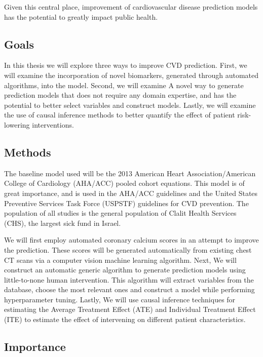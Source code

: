 \documentclass[a4paper,12pt]{article}
\begin{document}
		Given this central place, improvement of cardiovascular disease prediction models has the potential to greatly impact public health.
		
		\subsection{Goals}
		
		In this thesis we will explore three ways to improve CVD prediction. First, we will examine the incorporation of novel biomarkers, generated through automated algorithms, into the model. Second, we will examine A novel way to generate prediction models that does not require any domain expertise, and has the potential to better select variables and construct models. Lastly, we will examine the use of causal inference methods to better quantify the effect of patient risk-lowering interventions.

		\subsection{Methods}
		
		The baseline model used will be the 2013 American Heart Association/American College of Cardiology (AHA/ACC) pooled cohort equations\cite{Goff2014}. This model is of great importance, and is used in the AHA/ACC guidelines and the United States Preventive Services Task Force (USPSTF) guidelines for CVD prevention\cite{Bibbins-Domingo2016}. The population of all studies is the general population of Clalit Health Services (CHS), the largest sick fund in Israel.
		
		We will first employ automated coronary calcium scores in an attempt to improve the prediction. These scores will be generated automatically from existing chest CT scans via a computer vision machine learning algorithm. Next, We will construct an automatic generic algorithm to generate prediction models using little-to-none human intervention. This algorithm will extract variables from the database, choose the most relevant ones and construct a model while performing hyperparameter tuning. Lastly, We will use causal inference techniques for estimating the Average Treatment Effect (ATE) and Individual Treatment Effect (ITE) to estimate the effect of intervening on different patient characteristics.
		
		\subsection{Importance}
		
\end{document}
